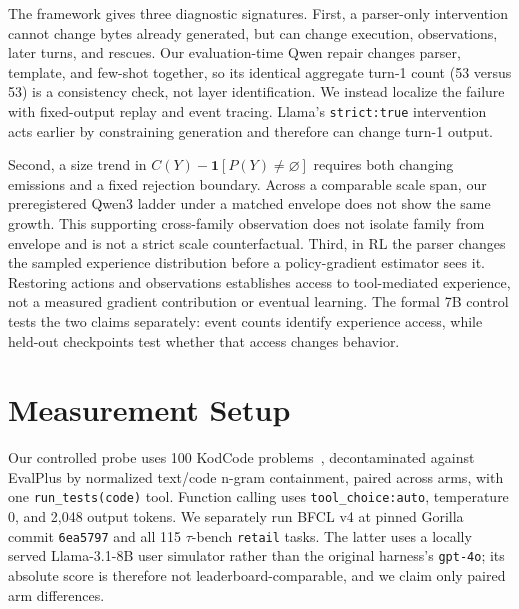The framework gives three diagnostic signatures. First, a parser-only intervention cannot change
bytes already generated, but can change execution, observations, later turns, and rescues. Our
evaluation-time Qwen repair changes parser, template, and few-shot together, so its identical
aggregate turn-1 count (53 versus 53) is a consistency check, not layer identification. We instead
localize the failure with fixed-output replay and event tracing. Llama's \texttt{strict:true}
intervention acts earlier by constraining generation and therefore can change turn-1 output.

Second, a size trend in $C(Y)-\mathbf{1}[P(Y)\neq\varnothing]$ requires both changing emissions
and a fixed rejection boundary. Across a comparable scale span, our preregistered Qwen3 ladder
under a matched envelope does not show the same growth. This supporting cross-family observation
does not isolate family from envelope and is not a strict scale counterfactual. Third, in RL the parser
changes the sampled experience distribution before a policy-gradient estimator sees it. Restoring
actions and observations establishes access to tool-mediated experience, not a measured
gradient contribution or eventual learning. The formal 7B control tests the two claims separately: event counts identify
experience access, while held-out checkpoints test whether that access changes behavior.

\section{Measurement Setup}
\label{sec:setup}
\label{sec:control}
\label{sec:gating}

Our controlled probe uses 100 KodCode problems~\citep{kodcode2025}, decontaminated against
EvalPlus by normalized text/code n-gram containment, paired across arms, with one
\texttt{run\_tests(code)} tool. Function calling uses
\texttt{tool\_choice:auto}, temperature 0, and 2,048 output tokens. We separately run BFCL v4 at
pinned Gorilla commit \texttt{6ea5797} and all 115 $\tau$-bench \texttt{retail} tasks. The latter
uses a locally served Llama-3.1-8B user simulator rather than the original harness's
\texttt{gpt-4o}; its absolute score is therefore not leaderboard-comparable, and we claim only
paired arm differences.

